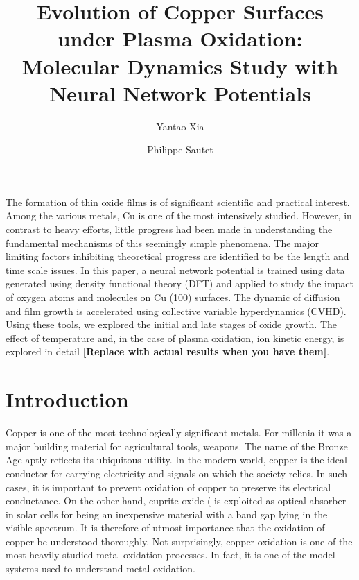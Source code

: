 \message{ !name(paper.tex)}\documentclass[manuscript=cmatex]{achemso}
\title          {Evolution of Copper Surfaces under Plasma Oxidation: Molecular Dynamics Study with Neural Network Potentials}
\author         {Yantao Xia}
\affiliation    {Department of Chemical and Biomolecular Engineering, University of California, Los Angeles, CA 90095, USA}
\author         {Philippe Sautet}
\affiliation    {Department of Chemical and Biomolecular Engineering, University of California, Los Angeles, CA 90095, USA}
\begin{document}

\abstract
The formation of thin oxide films is of significant scientific and practical interest. Among the various metals, Cu is one of the most intensively studied. However, in contrast to heavy efforts, little progress had been made in understanding the fundamental mechanisms of this seemingly simple phenomena. The major limiting factors inhibiting theoretical progress are identified to be the length and time scale issues. In this paper, a neural network potential is trained using data generated using density functional theory (DFT) and applied to study the impact of oxygen atoms and molecules on Cu (100) surfaces. The dynamic of diffusion and film growth is accelerated using collective variable hyperdynamics (CVHD). Using these tools, we explored the initial and late stages of oxide growth. The effect of temperature and, in the case of plasma oxidation, ion kinetic energy, is explored in detail \textbf{[Replace with actual results when you have them]}.

\section{Introduction}
\label{sec:intro}
Copper is one of the most technologically significant metals. For millenia it was a major building material for agricultural tools, weapons. The name of the Bronze Age aptly reflects its ubiquitous utility. In the modern world, copper is the ideal conductor for carrying electricity and signals on which the society relies. In such cases, it is important to prevent oxidation of copper to preserve its electrical conductance. On the other hand, cuprite oxide ( is exploited as optical absorber in solar cells for being an inexpensive material with a band gap lying in the visible spectrum. It is therefore of utmost importance that the oxidation of copper be understood thoroughly. Not surprisingly, copper oxidation is one of the most heavily studied metal oxidation processes.\cite{gattinoni_atomistic_2015} In fact, it is one of the model systems used to understand metal oxidation.
% 
\end{document}
